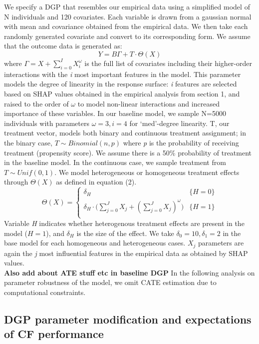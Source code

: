 \documentclass[12pt]{article}
\begin{document}
We specify a DGP that resembles our empirical data using a simplified model of N individuals and 120 covariates. Each variable is drawn from a gaussian normal with mean and covariance obtained from the empirical data. We then take each randomly generated covariate and convert to its corresponding form. We assume that the outcome data is generated as: 
\[ Y = B \Gamma + T  \cdot \Theta(X) \tag{1} \label{eq:special}\]
where $\Gamma = X + \sum_{i = 0}^{I} X_i^\omega$ is the full list of covariates including their higher-order interactions with the \textit{i} most important features in the model. This parameter models the degree of linearity in the response surface: \textit{i} features are selected based on SHAP values obtained in the empirical analysis from section 1, and raised to the order of $\omega$ to model non-linear interactions and increased importance of these variables. In our baseline model, we sample N=5000 individuals with parameters $\omega = 3, i = 4$ for `med'-degree linearity. T, our treatment vector, models both binary and continuous treatment assignment; in the binary case, $ T \sim Binomial(n,p)$ where \textit{p} is the probability of receiving treatment (propensity score). We assume there is a 50\% probability of treatment in the baseline model. In the continuous case, we sample treatment from $T \sim Unif(0,1)$. We model heterogeneous or homogeneous treatment effects through $\Theta(X)$ as defined in equation (2). 
\[
\Theta(X) =  \begin{cases} 
	 \delta_H & {\{H = 0\}} \\ 
	 \delta_H \cdot \big( \sum_{j = 0}^{J} X_j + (\sum_{j = 0}^{J} X_j )^\omega ) & \{ H = 1 \} \\ 
\end{cases} \tag{2} \label{eq:special} \]
Variable \textit{H} indicates whether heterogenous treatment effects are present in the model ($H = 1$), and $\delta_H$ is the size of the effect. We take $\delta_0 = 10, \delta_1 = 2$ in the base model for each homogeneous and heterogeneous cases. $X_j$ parameters are again the \textit{j} most influential features in the empirical data as obtained by SHAP values. \\

\textbf{Also add about ATE stuff etc in baseline DGP} In the following analysis on parameter robustness of the model, we omit CATE estimation due to computational constraints. 

\subsection{DGP parameter modification and expectations of CF performance}
\end{document}
